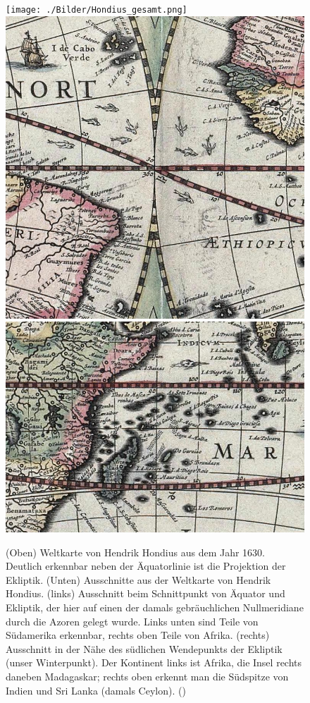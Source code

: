 \begin{figure}[p]
\texttt{[image: ./Bilder/Hondius\_gesamt.png]}\\[0.2cm]
\includegraphics[scale=0.2]{./Bilder/Hondius_00.jpg} \hfill
\includegraphics[scale=0.31]{./Bilder/Hondius_90.jpg}
\caption{\label{fig_Hondius}%
(Oben) Weltkarte von Hendrik Hondius aus dem Jahr 1630. Deutlich erkennbar neben der
\"Aquatorlinie ist die Projektion der Ekliptik. (Unten)
Ausschnitte aus der Weltkarte von Hendrik Hondius. (links) Ausschnitt beim Schnittpunkt von 
\"Aquator und Ekliptik, der hier auf einen der damals gebr\"auchlichen Nullmeridiane durch die
Azoren gelegt wurde. Links unten sind Teile von S\"udamerika erkennbar, rechts oben Teile von
Afrika. (rechts) Ausschnitt in der N\"ahe des s\"udlichen Wendepunkts der Ekliptik (unser
Winterpunkt). Der Kontinent links ist Afrika, die Insel rechts daneben Madagaskar; rechts oben
erkennt man die S\"udspitze von Indien und Sri Lanka (damals Ceylon). (\cite{Puzzle})}
\end{figure}

